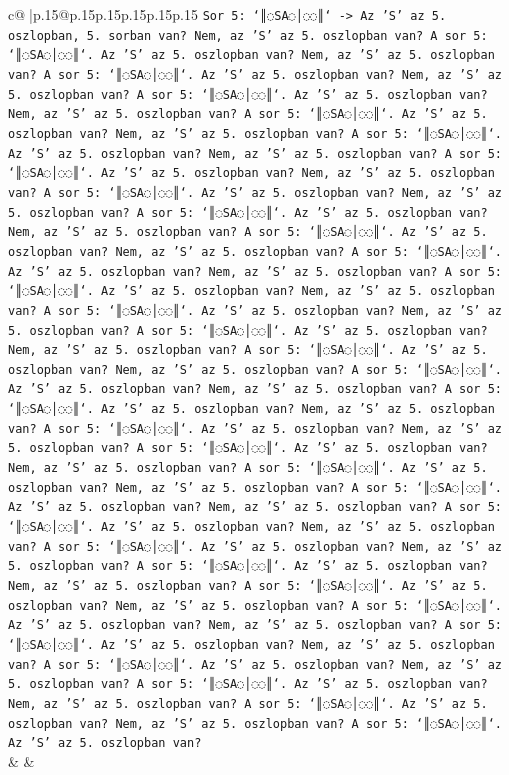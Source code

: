 \documentclass{article}
\begin{document}
{\begin{supertabular}{c@{$\;$}|p{.15\linewidth}@{}p{.15\linewidth}p{.15\linewidth}p{.15\linewidth}p{.15\linewidth}p{.15\linewidth}}
{{{\texttt{Sor 5: `║◌SA◌│◌◌║` {-}> Az 'S' az 5. oszlopban, 5. sorban van? Nem, az 'S' az 5. oszlopban van? A sor 5: `║◌SA◌│◌◌║`. Az 'S' az 5. oszlopban van? Nem, az 'S' az 5. oszlopban van? A sor 5: `║◌SA◌│◌◌║`. Az 'S' az 5. oszlopban van? Nem, az 'S' az 5. oszlopban van? A sor 5: `║◌SA◌│◌◌║`. Az 'S' az 5. oszlopban van? Nem, az 'S' az 5. oszlopban van? A sor 5: `║◌SA◌│◌◌║`. Az 'S' az 5. oszlopban van? Nem, az 'S' az 5. oszlopban van? A sor 5: `║◌SA◌│◌◌║`. Az 'S' az 5. oszlopban van? Nem, az 'S' az 5. oszlopban van? A sor 5: `║◌SA◌│◌◌║`. Az 'S' az 5. oszlopban van? Nem, az 'S' az 5. oszlopban van? A sor 5: `║◌SA◌│◌◌║`. Az 'S' az 5. oszlopban van? Nem, az 'S' az 5. oszlopban van? A sor 5: `║◌SA◌│◌◌║`. Az 'S' az 5. oszlopban van? Nem, az 'S' az 5. oszlopban van? A sor 5: `║◌SA◌│◌◌║`. Az 'S' az 5. oszlopban van? Nem, az 'S' az 5. oszlopban van? A sor 5: `║◌SA◌│◌◌║`. Az 'S' az 5. oszlopban van? Nem, az 'S' az 5. oszlopban van? A sor 5: `║◌SA◌│◌◌║`. Az 'S' az 5. oszlopban van? Nem, az 'S' az 5. oszlopban van? A sor 5: `║◌SA◌│◌◌║`. Az 'S' az 5. oszlopban van? Nem, az 'S' az 5. oszlopban van? A sor 5: `║◌SA◌│◌◌║`. Az 'S' az 5. oszlopban van? Nem, az 'S' az 5. oszlopban van? A sor 5: `║◌SA◌│◌◌║`. Az 'S' az 5. oszlopban van? Nem, az 'S' az 5. oszlopban van? A sor 5: `║◌SA◌│◌◌║`. Az 'S' az 5. oszlopban van? Nem, az 'S' az 5. oszlopban van? A sor 5: `║◌SA◌│◌◌║`. Az 'S' az 5. oszlopban van? Nem, az 'S' az 5. oszlopban van? A sor 5: `║◌SA◌│◌◌║`. Az 'S' az 5. oszlopban van? Nem, az 'S' az 5. oszlopban van? A sor 5: `║◌SA◌│◌◌║`. Az 'S' az 5. oszlopban van? Nem, az 'S' az 5. oszlopban van? A sor 5: `║◌SA◌│◌◌║`. Az 'S' az 5. oszlopban van? Nem, az 'S' az 5. oszlopban van? A sor 5: `║◌SA◌│◌◌║`. Az 'S' az 5. oszlopban van? Nem, az 'S' az 5. oszlopban van? A sor 5: `║◌SA◌│◌◌║`. Az 'S' az 5. oszlopban van? Nem, az 'S' az 5. oszlopban van? A sor 5: `║◌SA◌│◌◌║`. Az 'S' az 5. oszlopban van? Nem, az 'S' az 5. oszlopban van? A sor 5: `║◌SA◌│◌◌║`. Az 'S' az 5. oszlopban van? Nem, az 'S' az 5. oszlopban van? A sor 5: `║◌SA◌│◌◌║`. Az 'S' az 5. oszlopban van? Nem, az 'S' az 5. oszlopban van? A sor 5: `║◌SA◌│◌◌║`. Az 'S' az 5. oszlopban van? Nem, az 'S' az 5. oszlopban van? A sor 5: `║◌SA◌│◌◌║`. Az 'S' az 5. oszlopban van? Nem, az 'S' az 5. oszlopban van? A sor 5: `║◌SA◌│◌◌║`. Az 'S' az 5. oszlopban van? Nem, az 'S' az 5. oszlopban van? A sor 5: `║◌SA◌│◌◌║`. Az 'S' az 5. oszlopban van? Nem, az 'S' az 5. oszlopban van? A sor 5: `║◌SA◌│◌◌║`. Az 'S' az 5. oszlopban van? Nem, az 'S' az 5. oszlopban van? A sor 5: `║◌SA◌│◌◌║`. Az 'S' az 5. oszlopban van?} \\
            }
        }
    }
    & & \\ \\


\end{supertabular}}
\end{document}
